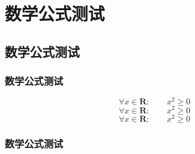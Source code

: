 \chapter{数学公式测试}
	\section{数学公式测试}
		\subsection{数学公式测试}
		\begin{equation}
		\forall x \in \mathbf{R}:
		\qquad x^{2} \geq 0
		\end{equation}
		\begin{equation}
		\forall x \in \mathbf{R}:
		\qquad x^{2} \geq 0
		\end{equation}
		\begin{equation}
		\forall x \in \mathbf{R}:
		\qquad x^{2} \geq 0
		\end{equation}
		\subsection{数学公式测试}
	
	
	



			